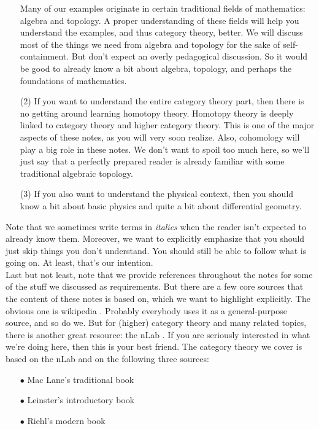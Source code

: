 \begin{enumerate}
Many of our examples originate in certain traditional fields of mathematics: algebra and topology.
A proper understanding of these fields will help you understand the examples, and thus category theory, better.
We will discuss most of the things we need from algebra and topology for the sake of self-containment.
But don't expect an overly pedagogical discussion.
So it would be good to already know a bit about algebra, topology, and perhaps the foundations of mathematics.
\item[(2)]
If you want to understand the entire category theory part, then there is no getting around learning homotopy theory.
Homotopy theory is deeply linked to category theory and higher category theory.
This is one of the major aspects of these notes, as you will very soon realize.
Also, cohomology will play a big role in these notes.
We don't want to spoil too much here, so we'll just say that a perfectly prepared reader is already familiar with some traditional algebraic topology.
\item[(3)]
If you also want to understand the physical context, then you should know a bit about basic physics and quite a bit about differential geometry.
\end{enumerate}
Note that we sometimes write terms in \textit{italics} when the reader isn't expected to already know them.
Moreover, we want to explicitly emphasize that you should just skip things you don't understand.
You should still be able to follow what is going on.
At least, that's our intention.
\\
Last but not least, note that we provide references throughout the notes for some of the stuff we discussed as requirements.
But there are a few core sources that the content of these notes is based on, which we want to highlight explicitly.
The obvious one is wikipedia \cite{wiki-pedia0en}.
Probably everybody uses it as a general-purpose source, and so do we.
But for (higher) category theory and many related topics, there is another great resource: the nLab \cite{wiki-nlab0000}.
If you are seriously interested in what we're doing here, then this is your best friend.
The category theory we cover is based on the nLab and on the following three sources:
\begin{enumerate}
\item[$\bullet$]
Mac Lane's traditional book \cite{e837ef86}
\item[$\bullet$]
Leinster's introductory book \cite{dc6f686f}
\item[$\bullet$]
Riehl's modern book \cite{52fbba46}
\end{enumerate}

